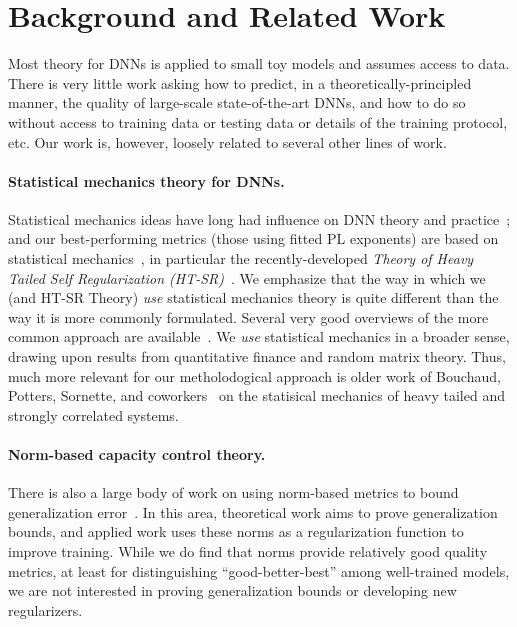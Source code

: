 \section{Background and Related Work}
\label{sxn:background}

Most theory for DNNs is applied to small toy models and assumes access to data.
There is very little work asking how to predict, in a theoretically-principled manner, the quality of large-scale state-of-the-art DNNs, and how to do so without access to training data or testing data or details of the training protocol, etc.
Our work is, however, loosely related to several other lines of work.


\paragraph{Statistical mechanics theory for DNNs.}

Statistical mechanics ideas have long had influence on DNN theory and practice~\cite{EB01_BOOK, MM17_TR, BKPx20}; and 
our best-performing metrics (those using fitted PL exponents) are based on statistical mechanics~\cite{MM17_TR, MM18_TR, MM19_HTSR_ICML, MM19_KDD, MM20_SDM}, in particular the recently-developed \emph{Theory of Heavy Tailed Self Regularization (HT-SR)}~\cite{MM18_TR, MM19_HTSR_ICML, MM20_SDM}.  
We emphasize that the way in which we (and HT-SR Theory) \emph{use} statistical mechanics theory is quite different than the way it is more commonly formulated.
Several very good overviews of the more common approach are available~\cite{EB01_BOOK, BKPx20}.
We \emph{use} statistical mechanics in a broader sense, drawing upon results from quantitative finance and random matrix theory.  %
Thus, much more relevant for our metholodogical approach is older work of Bouchaud, Potters, Sornette, and coworkers~\cite{BouchaudPotters03, SornetteBook, BP11, bun2017} on the statisical mechanics of heavy tailed and strongly correlated systems.


\paragraph{Norm-based capacity control theory.}

There is also a large body of work on using norm-based metrics to bound generalization error~\cite{NTS15, BFT17_TR, LMBx18_TR}.
In this area, theoretical work aims to prove generalization bounds, and applied work uses these norms as a regularization function to improve training.
While we do find that norms provide relatively good quality metrics, at least for distinguishing ``good-better-best'' among well-trained models, we are not interested in proving generalization bounds or developing new regularizers.



